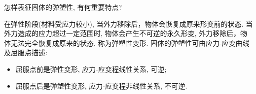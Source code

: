 \begin{problem}[05]
怎样表征固体的弹塑性, 有何重要特点?
\end{problem}
\begin{solution}
在弹性阶段(材料受应力较小), 当外力移除后，物体会恢复成原来形变前的状态. 当外力造成的应力超过一定范围时, 物体会产生不可逆的永久形变, 外力移除后，物体无法完全恢复成原来的状态, 称为弹塑性变形. 固体的弹塑性可由应力-应变曲线及屈服点描述: 
\begin{itemize}
\item 屈服点前是弹性变形, 应力-应变程线性关系, 可逆; 
\item 屈服点后是弹塑性变形, 应力-应变程非线性关系, 不可逆.
\end{itemize}
\end{solution}
